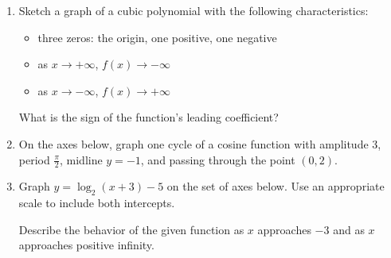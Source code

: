 \documentclass[12pt, oneside]{article}
\begin{document}
\begin{enumerate}
\item Sketch a graph of a cubic polynomial with the following characteristics: 
\begin{itemize}
\item three zeros: the origin, one positive, one negative
\item as $x \rightarrow + \infty$, $f(x) \rightarrow - \infty$
\item as $x \rightarrow - \infty$, $f(x) \rightarrow + \infty$
\end{itemize}
\begin{center}
\end{center} %
What is the sign of the function's leading coefficient?




\newpage
\item On the axes below, graph one cycle of a cosine function with amplitude 3, period $\displaystyle \frac{\pi}{2}$, midline $y=-1$, and passing through the point $(0,2)$.
\begin{center}
\end{center} %

\newpage

\item Graph $y= \log_2(x+3)-5$ on the set of axes below. Use an appropriate scale to include both intercepts.
\begin{center}
\end{center}

Describe the behavior of the given function as $x$ approaches $-3$ and as $x$ approaches positive infinity. %


\end{enumerate}
\end{document}
